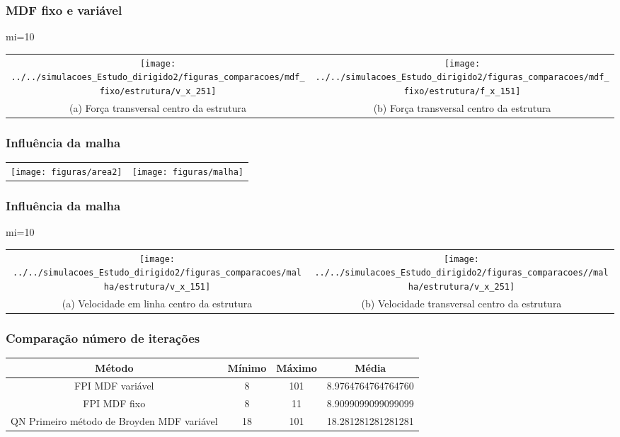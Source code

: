 \documentclass[xcolor=dvipsnames,10pt,aspectratio=169]{beamer}
\begin{document}
		\begin{frame}
		\frametitle{MDF fixo e variável}
		mi=10
		\begin{tabular}{c c}
				{\texttt{[image: ../../simulacoes\_Estudo\_dirigido2/figuras\_comparacoes/mdf\_fixo/estrutura/v\_x\_251]}}&{\texttt{[image: ../../simulacoes\_Estudo\_dirigido2/figuras\_comparacoes/mdf\_fixo/estrutura/f\_x\_151]}}\\
				{(a) Força transversal centro da estrutura} & {(b) Força transversal centro da estrutura}
			\end{tabular}
		\end{frame}
	
		\begin{frame}
			\frametitle{Influência da malha}

			\begin{tabular}{c c}
				{\texttt{[image: figuras/area2]}}&{\texttt{[image: figuras/malha]}}
			\end{tabular}
		\end{frame}
	
		\begin{frame}
			\frametitle{Influência da malha}
			mi=10
			\begin{tabular}{c c}
				{\texttt{[image: ../../simulacoes\_Estudo\_dirigido2/figuras\_comparacoes/malha/estrutura/v\_x\_151]}}&{\texttt{[image: ../../simulacoes\_Estudo\_dirigido2/figuras\_comparacoes//malha/estrutura/v\_x\_251]}}\\
				{(a) Velocidade em linha centro da estrutura} & {(b) Velocidade transversal centro da estrutura}
			\end{tabular}
		\end{frame}	
	
		\begin{frame}
			\frametitle{Comparação número de iterações}
			\begin{tabular}{c c c c}
				\hline
				Método & Mínimo     &    Máximo &  Média\\ \hline
				FPI MDF variável & 8     &    101 &  8.9764764764764760\\
				FPI MDF fixo & 8     &     11 &  8.9099099099099099\\
				QN Primeiro método de Broyden MDF variável & 18    &     101 &  18.281281281281281 \\ \hline
			\end{tabular}
		\end{frame}	
	
\end{document}
